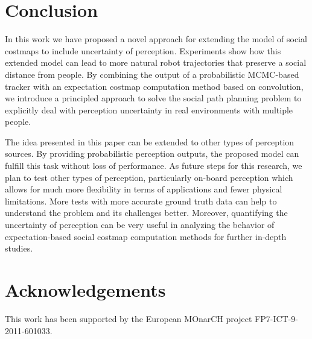 \section{Conclusion}
\label{sec:conclusion}

In this work we have proposed a novel approach for extending the model of social costmaps to include uncertainty of perception. Experiments show how this extended model can lead to more natural robot trajectories that preserve a social distance from people. By combining the output of a probabilistic MCMC-based tracker with an expectation costmap computation method based on convolution, we introduce a principled approach to solve the social path planning problem to explicitly deal with perception uncertainty in real environments with multiple people. 

The idea presented in this paper can be extended to other types of perception sources. By providing probabilistic perception outputs, the proposed model can fulfill this task without loss of performance. As future steps for this research, we plan to test other types of perception, particularly on-board perception which allows for much more flexibility in terms of applications and fewer physical limitations.
 More tests with more accurate ground truth data can help to understand the problem and its challenges better. Moreover, quantifying the uncertainty of perception can be very useful in analyzing the behavior of expectation-based social costmap computation methods for further in-depth studies.  


\section*{Acknowledgements}

This work has been supported by the European MOnarCH project FP7-ICT-9-2011-601033. 